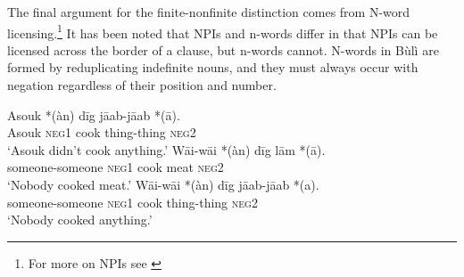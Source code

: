 \documentclass[output=paper,colorlinks,citecolor=brown]{langscibook}
\begin{document}
The final argument for the finite-nonfinite distinction comes from N-word licensing.\footnote{For more on NPIs see \citet{Zeijlstra2017}}
It has been noted that NPIs and n-words differ in that NPIs can be licensed across the border of a clause, but n-words cannot. 
N-words in Bùlì are formed by reduplicating indefinite nouns, and they must always occur with negation regardless of their position and number.

%
%
%
%

\ea%
    \label{ex:sulemana:14}
    \ea%
    \label{ex:sulemana:14a}
    \gll    Asouk  *(àn)  dīg jāab-jāab  *(ā). \\
            Asouk  \textsc{neg1} cook thing-thing  \textsc{neg2}  \\
    \glt    `Asouk didn't cook anything.' 
    \ex%
    \label{ex:sulemana:14b}
    \gll    Wāi-wāi  *(àn)  dīg lām  *(ā). \\
            someone-someone   \textsc{neg1}  cook meat  \textsc{neg2}  \\
    \glt    `Nobody cooked meat.' 
    \ex%
    \label{ex:sulemana:14c}
    \gll    Wāi-wāi  *(àn)  dīg jāab-jāab  *(a). \\
            someone-someone  \textsc{neg1}  cook thing-thing  \textsc{neg2}  \\
    \glt    `Nobody cooked anything.' 
    \z
\z
\end{document}

